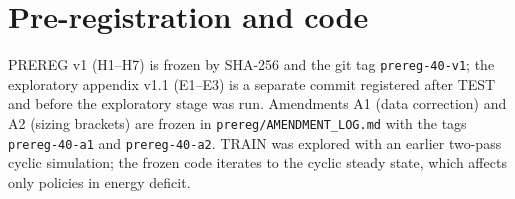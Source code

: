 \documentclass[10pt]{article}
\begin{document}
\section{Pre-registration and code}
PREREG v1 (H1--H7) is frozen by SHA-256 and the git tag \texttt{prereg-40-v1}; the exploratory appendix v1.1 (E1--E3) is a separate commit registered after TEST and before the exploratory stage was run. Amendments A1 (data correction) and A2 (sizing brackets) are frozen in \texttt{prereg/AMENDMENT\_LOG.md} with the tags \texttt{prereg-40-a1} and \texttt{prereg-40-a2}. TRAIN was explored with an earlier two-pass cyclic simulation; the frozen code iterates to the cyclic steady state, which affects only policies in energy deficit.
\end{document}
